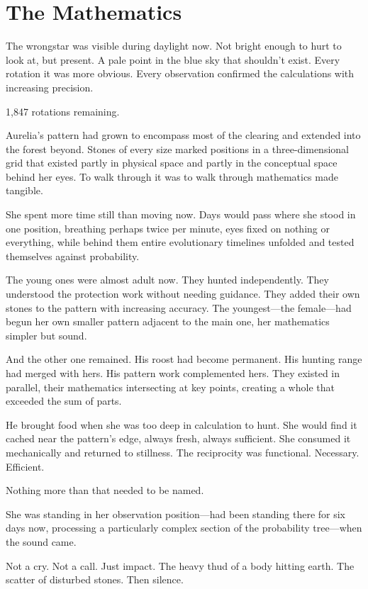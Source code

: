\chapter{The Mathematics}
\label{ch:07}


The wrongstar was visible during daylight now. Not bright enough to hurt to look at, but present. A pale point in the blue sky that shouldn't exist. Every rotation it was more obvious. Every observation confirmed the calculations with increasing precision.

1,847 rotations remaining.

Aurelia's pattern had grown to encompass most of the clearing and extended into the forest beyond. Stones of every size marked positions in a three-dimensional grid that existed partly in physical space and partly in the conceptual space behind her eyes. To walk through it was to walk through mathematics made tangible.

She spent more time still than moving now. Days would pass where she stood in one position, breathing perhaps twice per minute, eyes fixed on nothing or everything, while behind them entire evolutionary timelines unfolded and tested themselves against probability.

The young ones were almost adult now. They hunted independently. They understood the protection work without needing guidance. They added their own stones to the pattern with increasing accuracy. The youngest—the female—had begun her own smaller pattern adjacent to the main one, her mathematics simpler but sound.

And the other one remained. His roost had become permanent. His hunting range had merged with hers. His pattern work complemented hers. They existed in parallel, their mathematics intersecting at key points, creating a whole that exceeded the sum of parts.

He brought food when she was too deep in calculation to hunt. She would find it cached near the pattern's edge, always fresh, always sufficient. She consumed it mechanically and returned to stillness. The reciprocity was functional. Necessary. Efficient.

Nothing more than that needed to be named.

\scenebreak

She was standing in her observation position—had been standing there for six days now, processing a particularly complex section of the probability tree—when the sound came.

Not a cry. Not a call. Just impact. The heavy thud of a body hitting earth. The scatter of disturbed stones. Then silence.

